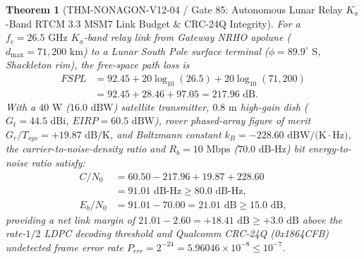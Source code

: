 \documentclass[11pt,a4paper,reqno]{article}
\def\bm#1{#1}%
\def\texttt#1{#1}%
\def\mathrm#1{#1}%
\theoremstyle{plain}
\newtheorem{theorem}{Theorem}[section]
\theoremstyle{definition}
\theoremstyle{remark}
\numberwithin{equation}{section}
\begin{document}
\begin{theorem}[{\texttt{THM-NONAGON-V12-04} / Gate 85: Autonomous Lunar Relay $K_a$-Band RTCM 3.3 MSM7 Link Budget \& CRC-24Q Integrity}]
\label{thm:gate85_lunar_rtcm_msm7}
For a $f_c = 26.5\text{ GHz}$ $K_a$-band relay link from Gateway NRHO apolune ($d_{\max} = 71,200\text{ km}$) to a Lunar South Pole surface terminal ($\phi = 89.9^\circ\text{ S}$, Shackleton rim), the free-space path loss is
\begin{equation}
\label{eq:gate85_fspl}
\begin{split}
  \mathrm{FSPL} &= 92.45 + 20\log_{10}(26.5) + 20\log_{10}(71,200) \\
  &= 92.45 + 28.46 + 97.05 = \bm{217.96\text{ dB}}.
\end{split}
\end{equation}
With a $40\text{ W}$ ($16.0\text{ dBW}$) satellite transmitter, $0.8\text{ m}$ high-gain dish ($G_t = 44.5\text{ dBi}$, $\mathrm{EIRP} = 60.5\text{ dBW}$), rover phased-array figure of merit $G_r / T_{\mathrm{sys}} = +19.87\text{ dB/K}$, and Boltzmann constant $k_B = -228.60\text{ dBW/(K}\cdot\text{Hz)}$, the carrier-to-noise-density ratio and $R_b = 10\text{ Mbps}$ ($70.0\text{ dB-Hz}$) bit energy-to-noise ratio satisfy:
\begin{align}
\label{eq:gate85_cn0}
  C/N_0 &= 60.50 - 217.96 + 19.87 + 228.60 \\
  &= \bm{91.01\text{ dB-Hz}} \ge 80.0\text{ dB-Hz}, \nonumber \\[1ex]
\label{eq:gate85_ebn0}
  E_b/N_0 &= 91.01 - 70.00 = \bm{21.01\text{ dB}} \ge 15.0\text{ dB},
\end{align}
providing a net link margin of $21.01 - 2.60 = \bm{+18.41\text{ dB}} \ge +3.0\text{ dB}$ above the rate-$1/2$ LDPC decoding threshold and Qualcomm CRC-24Q (\texttt{0x1864CFB}) undetected frame error rate $P_{\mathrm{err}} = 2^{-24} = \bm{5.96046 \times 10^{-8}} \le 10^{-7}$.
\end{theorem}
\end{document}

